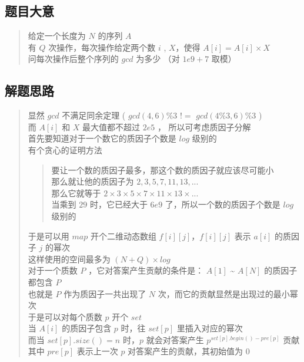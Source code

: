 \documentclass[E:/GsjzTle/main/main.tex]{subfiles}
\begin{document}
\hypertarget{header-n0}{%
\subsection{题目大意}\label{header-n0}}

\begin{quote}
给定一个长度为 \(N\) 的序列 \(A\)\\
有 \(Q\) 次操作，每次操作给定两个数 \(i\) , \(X\)，使得
\(A[i] = A[i] \times X\) \\
问每次操作后整个序列的 \(gcd\) 为多少 （对 \(1e9+7\) 取模）
\end{quote}

\hypertarget{header-n4}{%
\subsection{解题思路}\label{header-n4}}

\begin{quote}
显然 \(gcd\) 不满足同余定理 ( \(gcd(4,6) \% 3\) \(!=\)
\(gcd(4\%3,6)\%3\) )\\
而 \(A[i]\) 和 \(X\) 最大值都不超过 \(2e5\) ， 所以可考虑质因子分解\\
首先要知道对于一个数它的质因子个数是 \(log\) 级别的\\
有个贪心的证明方法

\begin{quote}
要让一个数的质因子最多，那这个数的质因子就应该尽可能小\\
那么就让他的质因子为 \(2,3,5,7,11,13,...\)\\
那么它就等于 \(2 × 3 × 5 × 7 × 11 × 13 ×...\) \\
当乘到 \(29\) 时，它已经大于 \(6e9\) 了，所以一个数的质因子个数是
\(log\) 级别的
\end{quote}

于是可以用 \(map\) 开个二维动态数组 \(f[i][j]\)，\(f[i][j]\) 表示
\(a[i]\) 的质因子 \(j\) 的幂次\\
这样使用的空间最多为 \((N + Q) × log\)\\
对于一个质数 \(P\) ，它对答案产生贡献的条件是： \(A[1] \)
\textasciitilde{} \(A[N]\) 的质因子都包含 \(P\)\\
也就是 \(P\) 作为质因子一共出现了 \(N\)
次，而它的贡献显然是出现过的最小幂次\\
于是可以对每个质数 \(p\) 开个 \(set\) \\
当 \(A[i]\) 的质因子包含 \(p\) 时，往 \(set[p]\) 里插入对应的幂次\\
而当 \(set[p].size() =n\) 时，\(p\) 就会对答案产生
\(p^{set[p].begin() - pre[p]}\) 贡献 \\
其中 \(pre[p]\) 表示上一次 \(p\) 对答案产生的贡献，其初始值为 \(0\)
\end{quote}
\end{document}
